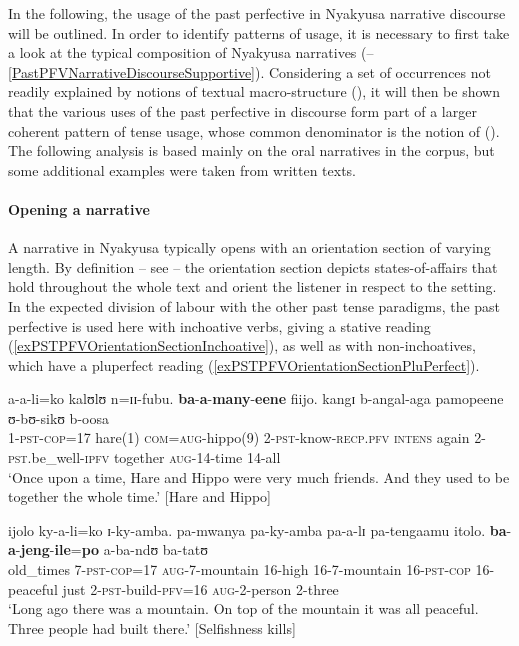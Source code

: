  
In the following, the usage of the past perfective in Nyakyusa narrative discourse will be outlined. In order to identify patterns of usage, it is necessary to first take a look at the typical composition of Nyakyusa narratives (--\ref{PastPFVNarrativeDiscourseSupportive}). Considering a set of occurrences not readily explained by notions of textual macro-structure (), it will then be shown that the various uses of the past perfective in  discourse form part of a larger coherent pattern of tense usage, whose common denominator is the notion of  (). The following analysis is based mainly on the oral narratives in the corpus, but some additional examples were taken from written texts.

  
\paragraph{Opening a narrative}\label{PastPFVNarrativeDiscourseOpenings}
A narrative in Nyakyusa typically opens with an orientation section of varying length. By definition  -- see  -- the orientation section depicts states-of-affairs that hold throughout the whole text and orient the listener in respect to the setting. In the expected division of labour with the other past tense paradigms, the past perfective is used here with inchoative verbs, giving a stative reading (\ref{exPSTPFVOrientationSectionInchoative}), as well as with non-inchoatives, which have a pluperfect reading (\ref{exPSTPFVOrientationSectionPluPerfect}).

\begin{exe}
\ex \label{exPSTPFVOrientationSectionInchoative}
\gll a-a-li=ko kalʊlʊ n=ɪɪ-fubu. \textbf{ba}-\textbf{a}-\textbf{many}-\textbf{eene} fiijo. kangɪ b-angal-aga pamopeene ʊ-bʊ-sikʊ b-oosa\\
1-\textsc{pst}-\textsc{cop}=17 hare(1) \textsc{com}=\textsc{aug}-hippo(9) 2-\textsc{pst}-know-\textsc{recp.pfv} \textsc{intens} again 2-\textsc{pst}.be\_well-\textsc{ipfv} together \textsc{aug}-14-time 14-all\\
\glt \lq Once upon a time, Hare and Hippo were very much friends. And they used to be together the whole time.' [Hare and Hippo]

\ex \label{exPSTPFVOrientationSectionPluPerfect}
\gll ijolo ky-a-li=ko ɪ-ky-amba. pa-mwanya pa-ky-amba pa-a-lɪ pa-tengaamu itolo. \textbf{ba}-\textbf{a}-\textbf{jeng}-\textbf{ile}=\textbf{po} a-ba-ndʊ ba-tatʊ\\
old\_times 7-\textsc{pst}-\textsc{cop}=17 \textsc{aug}-7-mountain 16-high 16-7-mountain 16-\textsc{pst}-\textsc{cop} 16-peaceful just 2-\textsc{pst}-build-\textsc{pfv}=16 \textsc{aug}-2-person 2-three\\
\glt \lq Long ago there was a mountain. On top of the mountain it was all peaceful. Three people had built there.' [Selfishness kills]
\end{exe}%

